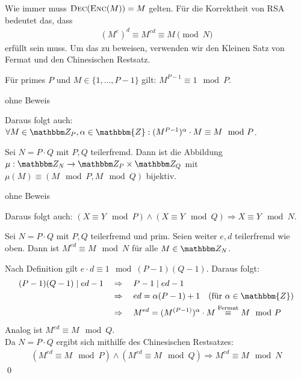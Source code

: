 Wie immer muss $\textsc{Dec}(\textsc{Enc}(M)) = M$ gelten. Für die Korrektheit von RSA
bedeutet das, dass
\begin{align*} (M^e)^d \equiv M^{ed} \equiv M \pmod N
\end{align*} erfüllt sein muss. Um das zu beweisen, verwenden wir den
Kleinen Satz von Fermat und den Chinesischen Restsatz.
\begin{theorem}\indexFermatLittleTheorem Für
  primes $P$ und $M \in \{1, \dotsc, P-1\}$ gilt: $M^{P-1} \equiv 1 \mod
  P$.
\end{theorem}
\begin{beweis} ohne Beweis
\end{beweis} Daraus folgt auch: $\forall M \in \Z P, \alpha \in
\mathbbm{Z} : (M^{P-1})^{\alpha} \cdot M \equiv M \mod P$.

\begin{theorem}\indexChineseRemainderTheorem Sei
  $N = P \cdot Q$ mit $P, Q$ teilerfremd. Dann ist die Abbildung $\mu : \Z
  N \rightarrow \Z P \times \Z Q$ mit $\mu(M) \equiv (M \mod P, M \mod Q)$
  bijektiv.
\end{theorem}
\begin{beweis} ohne Beweis
\end{beweis} Daraus folgt auch: $(X \equiv Y \mod P) \land (X \equiv Y
\mod Q) \Rightarrow X \equiv Y \mod N$.

\begin{theorem} Sei $N = P \cdot Q$ mit $P, Q$
  teilerfremd und prim. Seien weiter $e, d$ teilerfremd wie oben. Dann ist
  $M^{ed} \equiv M \mod N$ für alle $M \in \Z N$.
\end{theorem}

\begin{beweis} Nach Definition gilt $e \cdot d \equiv 1 \mod
  (P-1)(Q-1)$. Daraus folgt:
  \begin{align*} (P-1)(Q-1) \mid ed - 1 \quad & \Rightarrow \quad P-1 \mid
                                                ed - 1\\ & \Rightarrow \quad ed = \alpha (P-1) + 1 \quad (\text{für }
                                                           \alpha \in \mathbbm{Z})\\ & \Rightarrow \quad M^{ed} =
                                                                                       (M^{(P-1)})^{\alpha} \cdot M \stackrel{\text{Fermat}}\equiv M \mod P
  \end{align*} Analog ist $M^{ed} \equiv M \mod Q$.\\ Da $N = P \cdot Q$
  ergibt sich mithilfe des Chinesischen
  Restsatzes\indexChineseRemainderTheorem:
  \begin{align*} (M^{ed} \equiv M \mod P) \land (M^{ed} \equiv M \mod Q)
    \Rightarrow M^{ed} \equiv M \mod N
  \end{align*} \qed
\end{beweis}

